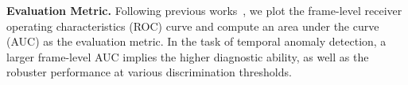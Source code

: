 \documentclass[10pt,twocolumn,letterpaper]{article}
\begin{document}
\textbf{Evaluation Metric.} Following previous works~\cite{Luo_2017_ICCV,he2017anomaly,Sultani_2018_CVPR}, we plot the frame-level receiver operating characteristics (ROC) curve and compute an area under the curve (AUC) as the evaluation metric. In the task of temporal anomaly detection, a larger frame-level AUC implies the higher diagnostic ability, as well as the robuster performance at various discrimination thresholds. 


\begin{table*}[!h]\small
\begin{floatrow}
\end{floatrow}
\end{table*}
\end{document}
